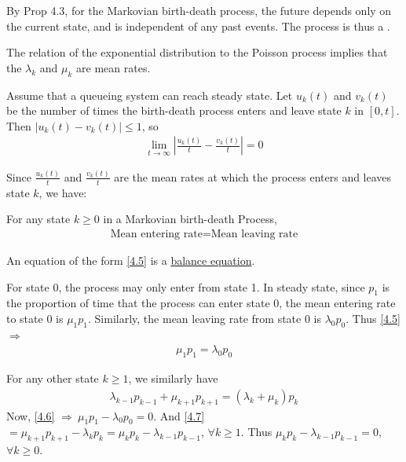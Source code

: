 \begin{remark}
    By Prop 4.3, for the Markovian birth-death process, the future depends only on the current state, and is independent of any past events. The process is thus a .
\end{remark}

The relation of the exponential distribution to the Poisson process implies that the $\lambda_k$ and $\mu_k$ are mean rates.

Assume that a queueing system can reach steady state. Let $u_k(t)$ and $v_k(t)$ be the number of times the birth-death process enters and leave state $k$ in $[0,t]$. Then $|u_k(t) - v_k(t)| \leqslant 1$, so
\begin{align*}
    \lim\limits_{t\to\infty} \left|\frac{u_k(t)}{t} - \frac{v_k(t)}{t}\right| = 0
\end{align*}

Since $\frac{u_k(t)}{t}$ and $\frac{v_k(t)}{t}$ are the mean rates at which the process enters and leaves state $k$, we have:
\begin{proposition}[Rate in $=$ Rate out Principle]
    For any state $k\geqslant 0$ in a Markovian birth-death Process, 
    \begin{align}
        \text{Mean entering rate}=\text{Mean leaving rate} \label{4.5}
    \end{align}

    An equation of the form \ref{4.5} is a \uline{balance equation}.
\end{proposition}

For state $0$, the process may only enter from state 1. In steady state, since $p_1$ is the proportion of time that the process can enter state $0$, the mean entering rate to state $0$ is $\mu_1 p_1$. Similarly, the mean leaving rate from state $0$ is $\lambda_0 p_0$. Thus \ref{4.5}$\Rightarrow$
\begin{align}
    \mu_1 p_1 = \lambda_0 p_0 \label{4.6}
\end{align}

For any other state $k\geqslant 1$, we similarly have 
\begin{align}
    \lambda_{k-1}p_{k-1} + \mu_{k+1}p_{k+1} = (\lambda_k + \mu_k) p_k \label{4.7}
\end{align}
Now, \ref{4.6} $\Rightarrow\ \mu_1 p_1 - \lambda_0 p_0 = 0$. And \ref{4.7} $= \mu_{k+1}p_{k+1} - \lambda_k p_k = \mu_k p_k - \lambda_{k-1}p_{k-1}$, $\forall k\geqslant 1$. Thus $\mu_k p_k - \lambda_{k-1}p_{k-1} = 0$, $\forall k\geqslant 0$.

